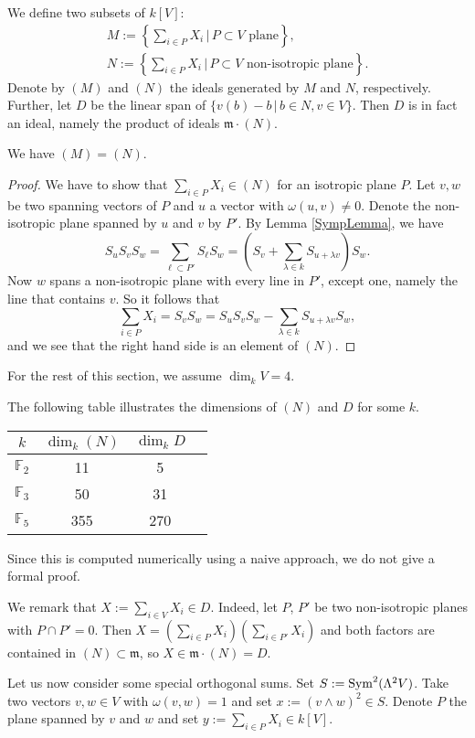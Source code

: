 \begin{definition} \label{SymplecticIdeal}
We define two subsets of $k[V]$:
\begin{gather*}
M := \left\{\sum_{i\in P}X_i \,|\, P\subset V \text{ plane}\right\}, \\
N  := \left\{\sum_{i\in P}X_i \,|\, P\subset V \text{ non-isotropic plane}\right\}.
\end{gather*}
Denote by $(M)$ and $(N)$ the ideals generated by $M$ and $N$, respectively. 
Further, let $D$ be the linear span of $\{v(b) - b \,|\, b\in N, v\in V \}$. Then $D$ is in fact an ideal, namely the product of ideals $\mathfrak m\cdot (N)$.
\end{definition}
\begin{proposition}
We have $(M)=(N)$.
\end{proposition}
\begin{proof}
We have to show that $\sum_{i\in P}X_i \in (N)$ for an isotropic plane $P$. Let $v,w$ be two spanning vectors of $P$ and $u$ a vector with $\omega(u,v)\neq 0$. Denote the non-isotropic plane spanned by $u $ and $v$ by $P'$. By Lemma \ref{SympLemma}, we have
$$
S_uS_vS_w = \sum_{\ell\subset P'} S_{\ell}S_w= \left(S_v+\sum_{\lambda\in k}S_{u + \lambda v}\right)S_w.
$$
Now $w$ spans a non-isotropic plane with every line in $P'$, except one, namely the line that contains $v$. So it follows that
$$
\sum_{i\in P}X_i = S_vS_w = S_uS_vS_w  - \sum_{\lambda\in k} S_{u + \lambda v}S_w, 
$$
and we see that the right hand side is an element of $(N)$.
\end{proof}
For the rest of this section, we assume $\dim_k V=4$. 
\begin{proposition} \label{SymplecticIdealsDimension}
The following table illustrates the dimensions of $(N)$ and $D$ for some $k$.
\vspace{2mm}
\begin{center}
\begin{tabular}{c||c|c|c}
 $k$ & $\dim_k(N)$ & $\dim_k D$ \\
\hline
$\mathbb F_2$   & 11 &  5  \\
$\mathbb F_3$  & 50 & 31  \\
$\mathbb F_5$  &355 &270
\end{tabular}
\end{center}
\end{proposition}
Since this is computed numerically using a naive approach, we do not give a formal proof.
\begin{rmk}\label{c2}
We remark that $X:=\sum_{i\in V}X_i\in D$. Indeed, let $P$, $P'$ be two non-isotropic planes with $P \cap P' = 0$. Then $X = \left( \sum_{i\in P}X_i\right)\left(  \sum_{i\in P'}X_i \right)$ and both factors are contained in $(N)\subset \mathfrak m$, so $X\in \mathfrak m \cdot (N) = D$.
\end{rmk}
Let us now consider some special orthogonal sums.
Set $S:=\operatorname{Sym}^2 (\Lambda^2V)$. Take two vectors $v,w\in V$ with $\omega(v,w)=1$ and set $x:= (v\wedge w)^2\in S$. Denote $P$ the plane spanned by $v$ and $w$ and set $y:= \sum_{i\in P}X_i\in  k[V]$.

